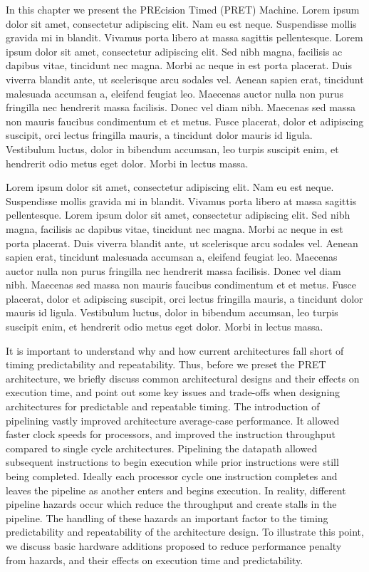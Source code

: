 In this chapter we present the PREcision Timed (PRET) Machine. 
Lorem ipsum dolor sit amet, consectetur adipiscing elit. Nam eu est neque. Suspendisse mollis gravida mi in blandit. Vivamus porta libero at massa sagittis pellentesque. Lorem ipsum dolor sit amet, consectetur adipiscing elit. Sed nibh magna, facilisis ac dapibus vitae, tincidunt nec magna. Morbi ac neque in est porta placerat. Duis viverra blandit ante, ut scelerisque arcu sodales vel. Aenean sapien erat, tincidunt malesuada accumsan a, eleifend feugiat leo. Maecenas auctor nulla non purus fringilla nec hendrerit massa facilisis. Donec vel diam nibh. Maecenas sed massa non mauris faucibus condimentum et et metus. Fusce placerat, dolor et adipiscing suscipit, orci lectus fringilla mauris, a tincidunt dolor mauris id ligula. Vestibulum luctus, dolor in bibendum accumsan, leo turpis suscipit enim, et hendrerit odio metus eget dolor. Morbi in lectus massa.

Lorem ipsum dolor sit amet, consectetur adipiscing elit. Nam eu est neque. Suspendisse mollis gravida mi in blandit. Vivamus porta libero at massa sagittis pellentesque. Lorem ipsum dolor sit amet, consectetur adipiscing elit. Sed nibh magna, facilisis ac dapibus vitae, tincidunt nec magna. Morbi ac neque in est porta placerat. Duis viverra blandit ante, ut scelerisque arcu sodales vel. Aenean sapien erat, tincidunt malesuada accumsan a, eleifend feugiat leo. Maecenas auctor nulla non purus fringilla nec hendrerit massa facilisis. Donec vel diam nibh. Maecenas sed massa non mauris faucibus condimentum et et metus. Fusce placerat, dolor et adipiscing suscipit, orci lectus fringilla mauris, a tincidunt dolor mauris id ligula. Vestibulum luctus, dolor in bibendum accumsan, leo turpis suscipit enim, et hendrerit odio metus eget dolor. Morbi in lectus massa.

It is important to understand why and how current architectures fall short of timing predictability and repeatability.
Thus, before we preset the PRET architecture, we briefly discuss common architectural designs and their effects on execution time, and point out some key issues and trade-offs when designing architectures for predictable and repeatable timing.
The introduction of pipelining vastly improved architecture average-case performance.
It allowed faster clock speeds for processors, and improved the instruction throughput compared to single cycle architectures.
Pipelining the datapath allowed subsequent instructions to begin execution while prior instructions were still being completed. 
Ideally each processor cycle one instruction completes and leaves the pipeline as another enters and begins execution. 
In reality, different pipeline hazards occur which reduce the throughput and create stalls in the pipeline.
The handling of these hazards an important factor to the timing predictability and repeatability of the architecture design.     
To illustrate this point, we discuss basic hardware additions proposed to reduce performance penalty from hazards, and their effects on execution time and predictability. 
  
